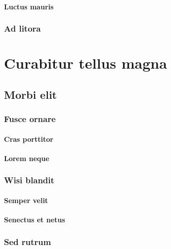\subsubsection{Luctus mauris} \lipsum[20]
\subsection{Ad litora} \lipsum [21-22]



\chapter{Curabitur tellus magna}


 \lipsum[1-2]

\section{Morbi elit} \lipsum[3-4]

\hbWideBottomArtFirstPageFix %

\subsection{Fusce ornare} \lipsum[5]

\subsubsection{Cras porttitor} \lipsum[6]
\subsubsection{Lorem neque} \lipsum[7]
\subsection{Wisi blandit} \lipsum[8]
\subsubsection{Semper velit} \lipsum[9]
\subsubsection{Senectus et netus} \lipsum[10]
\subsection{Sed rutrum} \lipsum[11-12]

